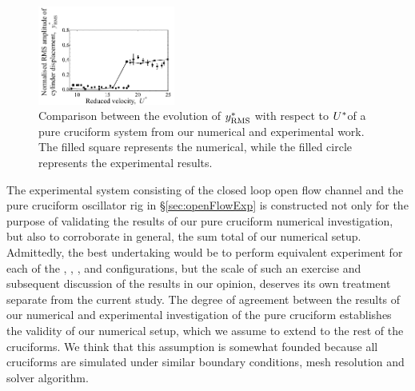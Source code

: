 \documentclass[oneside]{utmthesis}
\begin{document}
\begin{figure}
  \centering
  \includegraphics[width=0.4\textwidth]{figs/expCompareAmp}
  \caption{Comparison between the evolution of $y^{*}_{\text{RMS}}$ with respect to $U^{*}$of a pure cruciform system from our numerical and experimental work. The filled square represents the numerical, while the filled circle represents the experimental results.}
  \label{fig:expCompareAmp}
\end{figure}

The experimental system consisting of the closed loop open flow channel and the pure cruciform oscillator rig in \S\ref{sec:openFlowExp} is constructed not only for the purpose of validating the results of our pure cruciform numerical investigation, but also to corroborate in general, the sum total of our numerical setup. Admittedly, the best undertaking would be to perform equivalent experiment for each of the \angfi{}, \angfo{}, \angth{}, \angtw{} and \angon{} configurations, but the scale of such an exercise and subsequent discussion of the results in our opinion, deserves its own treatment separate from the current study. The degree of agreement between the results of our numerical and experimental investigation of the pure cruciform establishes the validity of our numerical setup, which we assume to extend to the rest of the cruciforms. We think that this assumption is somewhat founded because all cruciforms are simulated under similar boundary conditions, mesh resolution and solver algorithm.
\end{document}
